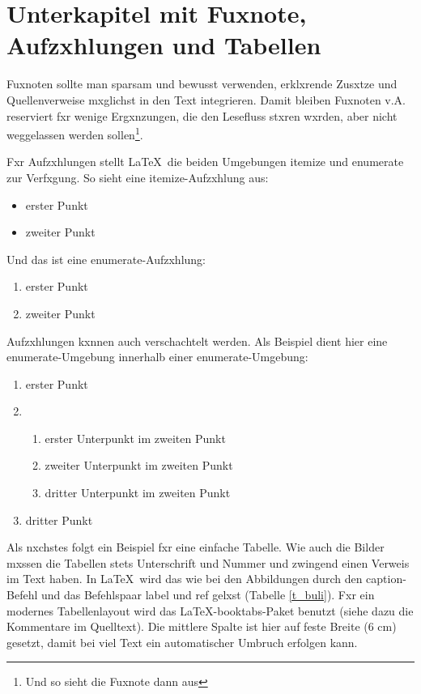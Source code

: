 \section{Unterkapitel mit Fuxnote, Aufzxhlungen und Tabellen}\label{sec_fussnot}

Fuxnoten sollte man sparsam und bewusst verwenden, erklxrende Zusxtze und Quellenverweise mxglichst in den Text integrieren. Damit bleiben Fuxnoten v.A. reserviert fxr wenige Ergxnzungen, die den Lesefluss stxren wxrden, aber nicht weggelassen werden sollen\footnote{Und so sieht die Fuxnote dann aus}.

Fxr Aufzxhlungen stellt \LaTeX\ die beiden Umgebungen itemize und enumerate zur Verfxgung. So sieht eine itemize-Aufzxhlung aus:

\begin{itemize}\setlength{\itemsep}{0ex} %
\item erster Punkt
\item zweiter Punkt
\end{itemize}

Und das ist eine enumerate-Aufzxhlung:

\begin{enumerate}\setlength{\itemsep}{0ex}
\item erster Punkt
\item zweiter Punkt
\end{enumerate}

Aufzxhlungen kxnnen auch verschachtelt werden. Als Beispiel dient hier eine enumerate-Umgebung innerhalb einer enumerate-Umgebung:

\begin{enumerate}\setlength{\itemsep}{0ex}
\item erster Punkt
\item 
	\begin{enumerate}\setlength{\itemsep}{-0.5ex}
	\item erster Unterpunkt im zweiten Punkt
	\item zweiter Unterpunkt im zweiten Punkt
	\item dritter Unterpunkt im zweiten Punkt
	\end{enumerate}
\item dritter Punkt
\end{enumerate}

Als nxchstes folgt ein Beispiel fxr eine einfache Tabelle. Wie auch die Bilder mxssen die Tabellen stets Unterschrift und Nummer und zwingend einen Verweis im Text haben. In \LaTeX\ wird das wie bei den Abbildungen durch den caption-Befehl und das Befehlspaar label und ref gelxst (Tabelle \ref{t_buli}). Fxr ein modernes Tabellenlayout wird das \LaTeX-booktabs-Paket benutzt (siehe dazu die Kommentare im Quelltext). Die mittlere Spalte ist hier auf feste Breite (6 cm) gesetzt, damit bei viel Text ein automatischer Umbruch erfolgen kann.


